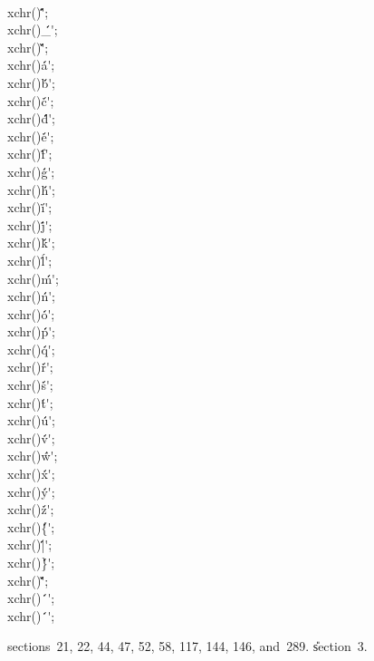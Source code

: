 \\{xchr}\?\1(\2)\K\?\.{\'\^\'};\5
\\{xchr}\?\1(\2)\K\?\.{\'\_\'};\6
\\{xchr}\?\1(\2)\K\?\.{\'\`\'};\5
\\{xchr}\?\1(\2)\K\?\.{\'a\'};\5
\\{xchr}\?\1(\2)\K\?\.{\'b\'};\5
\\{xchr}\?\1(\2)\K\?\.{\'c\'};\5
\\{xchr}\?\1(\2)\K\?\.{\'d\'};\5
\\{xchr}\?\1(\2)\K\?\.{\'e\'};\5
\\{xchr}\?\1(\2)\K\?\.{\'f\'};\5
\\{xchr}\?\1(\2)\K\?\.{\'g\'};\6
\\{xchr}\?\1(\2)\K\?\.{\'h\'};\5
\\{xchr}\?\1(\2)\K\?\.{\'i\'};\5
\\{xchr}\?\1(\2)\K\?\.{\'j\'};\5
\\{xchr}\?\1(\2)\K\?\.{\'k\'};\5
\\{xchr}\?\1(\2)\K\?\.{\'l\'};\5
\\{xchr}\?\1(\2)\K\?\.{\'m\'};\5
\\{xchr}\?\1(\2)\K\?\.{\'n\'};\5
\\{xchr}\?\1(\2)\K\?\.{\'o\'};\6
\\{xchr}\?\1(\2)\K\?\.{\'p\'};\5
\\{xchr}\?\1(\2)\K\?\.{\'q\'};\5
\\{xchr}\?\1(\2)\K\?\.{\'r\'};\5
\\{xchr}\?\1(\2)\K\?\.{\'s\'};\5
\\{xchr}\?\1(\2)\K\?\.{\'t\'};\5
\\{xchr}\?\1(\2)\K\?\.{\'u\'};\5
\\{xchr}\?\1(\2)\K\?\.{\'v\'};\5
\\{xchr}\?\1(\2)\K\?\.{\'w\'};\6
\\{xchr}\?\1(\2)\K\?\.{\'x\'};\5
\\{xchr}\?\1(\2)\K\?\.{\'y\'};\5
\\{xchr}\?\1(\2)\K\?\.{\'z\'};\5
\\{xchr}\?\1(\2)\K\?\.{\'\{\'};\5
\\{xchr}\?\1(\2)\K\?\.{\'|\'};\5
\\{xchr}\?\1(\2)\K\?\.{\'\}\'};\5
\\{xchr}\?\1(\2)\K\?\.{\'\~\'};\6
\\{xchr}\?\1(\?\2)\K\?\.{\'\ \'};\5
\\{xchr}\?\1(\2)\K\?\.{\'\ \'};\par
\A sections~21, 22, 44, 47, 52, 58, 117, 144, 146, and~289.
\U section~3\*.\fi

